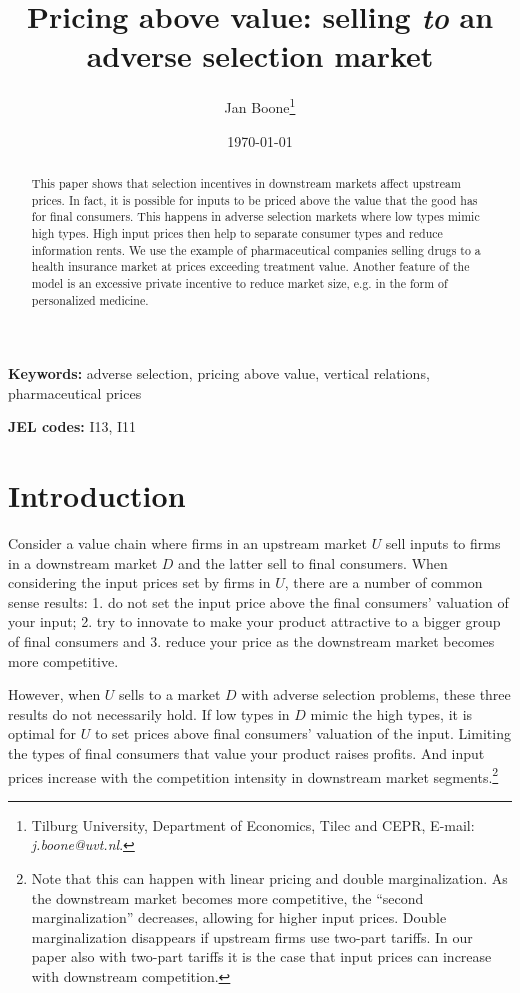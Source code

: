 \documentclass[a4paper,12pt]{article}
\author{Jan Boone\thanks{Tilburg University, Department of Economics, Tilec and CEPR, E-mail: \textit{j.boone@uvt.nl}.}}
\date{\today}
\title{Pricing above value: selling \emph{to} an adverse selection market}
\begin{document}
\maketitle
\begin{PREFACE}
\maketitle
\end{PREFACE}

\begin{abstract}
This paper shows that selection incentives in downstream markets affect upstream prices. In fact, it is possible for inputs to be priced above the value that the good has for final consumers. This happens in adverse selection markets where low types mimic high types. High input prices then help to separate consumer types and reduce information rents. We use the example of pharmaceutical companies selling drugs to a health insurance market at prices exceeding treatment value. Another feature of the model is an excessive private incentive to reduce market size, e.g. in the form of personalized medicine.
\end{abstract}

\textbf{Keywords:} adverse selection, pricing above value, vertical relations, pharmaceutical prices

\textbf{JEL codes:} I13, I11


\newpage

\section{Introduction}
\label{sec:orgb57d053}

Consider a value chain where firms in an upstream market \(U\) sell inputs to firms in a downstream market \(D\) and the latter sell to final consumers. When considering the input prices set by firms in \(U\), there are a number of common sense results: 1. do not set the input price above the final consumers' valuation of your input; 2. try to innovate to make your product attractive to a bigger group of final consumers and 3. reduce your price as the downstream market becomes more competitive.

However, when \(U\) sells to a market \(D\) with adverse selection problems, these three results do not necessarily hold. If low types in \(D\) mimic the high types, it is optimal for \(U\) to set prices above final consumers' valuation of the input. Limiting the types of final consumers that value your product raises profits. And input prices increase with the competition intensity in downstream market segments.\footnote{Note that this can happen with linear pricing and double marginalization. As the downstream market becomes more competitive, the ``second marginalization'' decreases, allowing for higher input prices. Double marginalization disappears if upstream firms use two-part tariffs. In our paper also with two-part tariffs it is the case that input prices can increase with downstream competition.}
\end{document}
